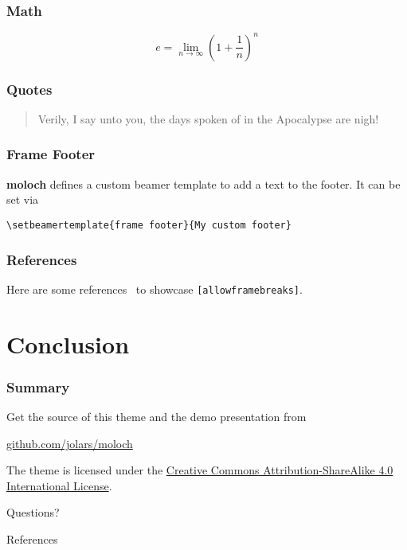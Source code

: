 \documentclass[10pt]{beamer}
\newcommand{\themename}{\textbf{moloch}\xspace}
\begin{document}
\begin{frame}
\frametitle{Math}
  \begin{equation*}
    e = \lim_{n\to \infty} \left(1 + \frac{1}{n}\right)^n
  \end{equation*}
\end{frame}

\begin{frame}
\frametitle{Quotes}
  \begin{quote}
    Verily, I say unto you, the days spoken of in the Apocalypse are nigh!
  \end{quote}
\end{frame}

{%
\begin{frame}[fragile]
\frametitle{Frame Footer}
  \themename defines a custom beamer template to add a text to the footer. It can be set via
  \begin{verbatim}\setbeamertemplate{frame footer}{My custom footer}\end{verbatim}
\end{frame}
}

\begin{frame}[fragile]
\frametitle{References}
  Here are some references~\cite{Knuth92,ConcreteMath,Simpson,Er01,greenwade93} to showcase \verb+[allowframebreaks]+.
\end{frame}

\section{Conclusion}

\begin{frame}
\frametitle{Summary}

  Get the source of this theme and the demo presentation from
  \begin{center}
    \url{github.com/jolars/moloch}
  \end{center}

  The theme is licensed under the
  \href{http://creativecommons.org/licenses/by-sa/4.0/}{Creative Commons
    Attribution-ShareAlike 4.0 International License}.

  \begin{center}
    \ccbysa
  \end{center}

\end{frame}

\begin{frame}[standout]
  Questions?
\end{frame}

\appendix

\begin{frame}[allowframebreaks]{References}
  
  
\end{frame}
\end{document}
